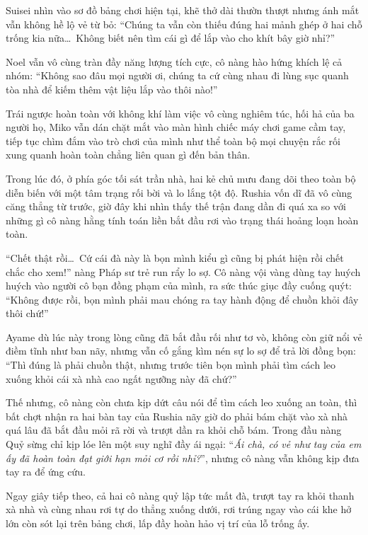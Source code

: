 \documentclass[../main.tex]{subfiles}
\begin{document}
Suisei nhìn vào sơ đồ bảng chơi hiện tại, khẽ thở dài thườn thượt nhưng ánh mắt vẫn không hề lộ vẻ từ bỏ: ``Chúng ta vẫn còn thiếu đúng hai mảnh ghép ở hai chỗ trống kia nữa\dots\ Không biết nên tìm cái gì để lắp vào cho khít bây giờ nhỉ?''

Noel vẫn vô cùng tràn đầy năng lượng tích cực, cô nàng hào hứng khích lệ cả nhóm: ``Không sao đâu mọi người ơi, chúng ta cứ cùng nhau đi lùng sục quanh tòa nhà để kiếm thêm vật liệu lắp vào thôi nào!''

Trái ngược hoàn toàn với không khí làm việc vô cùng nghiêm túc, hối hả của ba người họ, Miko vẫn dán chặt mắt vào màn hình chiếc máy chơi game cầm tay, tiếp tục chìm đắm vào trò chơi của mình như thể toàn bộ mọi chuyện rắc rối xung quanh hoàn toàn chẳng liên quan gì đến bản thân.

Trong lúc đó, ở phía góc tối sát trần nhà, hai kẻ chủ mưu đang dõi theo toàn bộ diễn biến với một tâm trạng rối bời và lo lắng tột độ. Rushia vốn dĩ đã vô cùng căng thẳng từ trước, giờ đây khi nhìn thấy thế trận đang dần đi quá xa so với những gì cô nàng hằng tính toán liền bắt đầu rơi vào trạng thái hoảng loạn hoàn toàn.

``Chết thật rồi\dots\ Cứ cái đà này là bọn mình kiểu gì cũng bị phát hiện rồi chết chắc cho xem!'' nàng Pháp sư trẻ run rẩy lo sợ. Cô nàng vội vàng dùng tay huých huých vào người cô bạn đồng phạm của mình, ra sức thúc giục đầy cuống quýt: ``Không được rồi, bọn mình phải mau chóng ra tay hành động để chuồn khỏi đây thôi chứ!''

Ayame dù lúc này trong lòng cũng đã bắt đầu rối như tơ vò, không còn giữ nổi vẻ điềm tĩnh như ban nãy, nhưng vẫn cố gắng kìm nén sự lo sợ để trả lời đồng bọn: ``Thì đúng là phải chuồn thật, nhưng trước tiên bọn mình phải tìm cách leo xuống khỏi cái xà nhà cao ngất ngưỡng này đã chứ?''

Thế nhưng, cô nàng còn chưa kịp dứt câu nói để tìm cách leo xuống an toàn, thì bất chợt nhận ra hai bàn tay của Rushia nãy giờ do phải bám chặt vào xà nhà quá lâu đã bắt đầu mỏi rã rời và trượt dần ra khỏi chỗ bám. Trong đầu nàng Quỷ sừng chỉ kịp lóe lên một suy nghĩ đầy ái ngại: ``\textit{Ái chà, có vẻ như tay của em ấy đã hoàn toàn đạt giới hạn mỏi cơ rồi nhỉ?}'', nhưng cô nàng vẫn không kịp đưa tay ra để ứng cứu.

Ngay giây tiếp theo, cả hai cô nàng quỷ lập tức mất đà, trượt tay ra khỏi thanh xà nhà và cùng nhau rơi tự do thẳng xuống dưới, rơi trúng ngay vào cái khe hở lớn còn sót lại trên bảng chơi, lấp đầy hoàn hảo vị trí của lỗ trống ấy.
\end{document}
